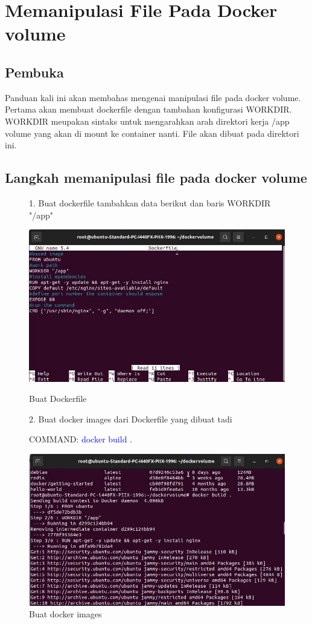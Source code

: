\chapter{Memanipulasi File Pada Docker volume}
\section{Pembuka}
Panduan kali ini akan membahas mengenai manipulasi file pada docker volume. Pertama akan membuat dockerfile dengan tambahan konfigurasi WORKDIR.
WORKDIR meupakan sintaks untuk mengarahkan arah direktori kerja /app volume yang akan di mount ke container nanti. File akan dibuat pada direktori ini.

\section{Langkah memanipulasi file pada docker volume}
    \begin{figure}
    1. Buat dockerfile tambahkan data berikut dan baris WORKDIR "/app"
        \begin{center}
            \includegraphics[width=\linewidth]{image/41.jpg}
            \caption{Buat Dockerfile}
            \label{fig:my_figure}
        \end{center}
    
    2. Buat docker images dari Dockerfile yang dibuat tadi
    
    COMMAND: \textcolor{Blue}{docker build .}
        \begin{center}
            \includegraphics[width=\linewidth]{image/42.jpg}
            \caption{Buat docker images}
            \label{fig:my_figure}
        \end{center}
\end{figure}


